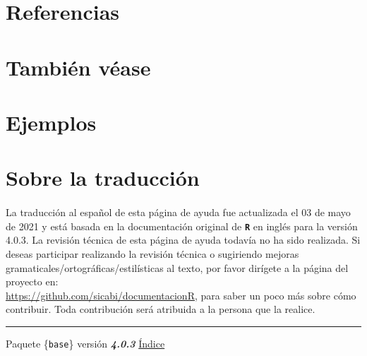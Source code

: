 \documentclass{article}[letter, 12pt]
\def\code#1{\texttt{#1}}
\def\codename#1{\textbf{\texttt{\color{gray}#1}}}
\begin{document}
\section{\color{gray}Referencias}

\section{\color{gray}También véase}

\section{\color{gray}Ejemplos}


\section{\color{gray}Sobre la traducción}
\paragraph{}
La traducción al español de esta página de ayuda fue actualizada el 03 de mayo de 2021 y está basada en la documentación original de \codename{R} en inglés para la versión 4.0.3. La revisión técnica de esta página de ayuda todavía no ha sido realizada. Si deseas participar realizando la revisión técnica o sugiriendo mejoras gramaticales/ortográficas/estilísticas al texto, por favor dirígete a la página del proyecto en: \\\href{https://github.com/sicabi/documentacionR}{https://github.com/sicabi/documentacionR}, para saber un poco más sobre cómo contribuir. Toda contribución será atribuida a la persona que la realice.
\\
\par\noindent\rule{\textwidth}{0.4pt}
\centerline{Paquete \{\code{base}\} versión \textbf{\emph{4.0.3}} \href{run:/Vocabulary.pdf}{Índice}}
\end{document}
